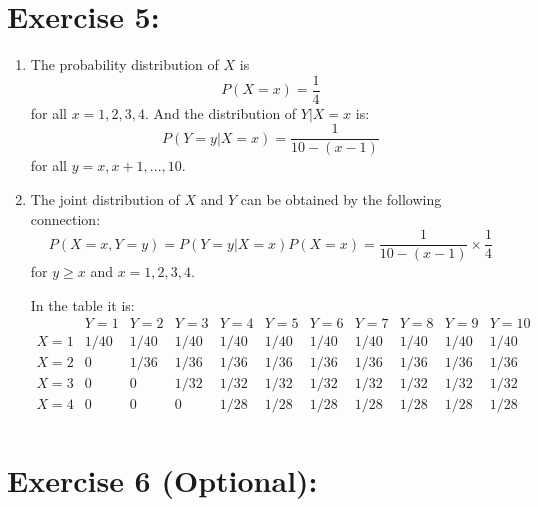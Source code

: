 \documentclass[12pt,thmsa]{article}
\begin{document}
\section*{Exercise 5:}

\begin{enumerate}
  \item The probability distribution of $X$ is
  \begin{equation*}
    P(X=x)=\frac{1}{4}  %
  \end{equation*}
for all $x=1,2,3,4$. And the distribution of $Y\vert X=x$ is:
  \begin{equation}
  P(Y=y\vert X=x)=\frac{1}{10-(x-1)} %
  \end{equation}
for all $y=x, x+1,...,10$.

  \item The joint distribution of $X$ and $Y$ can be obtained by the following connection:
\begin{equation*}
P(X=x,Y=y)=P(Y=y\vert X=x) P(X=x)=\frac{1}{10-(x-1)} \times \frac{1}{4}  %
\end{equation*}
for $y \geq x$ and $x=1,2,3,4$.

In the table it is:
$$
\begin{array}{c|c|c|c|c|c|c|c|c|c|c}
   & Y=1 & Y=2 & Y=3 & Y=4 & Y=5 & Y=6 & Y=7 & Y=8 & Y=9 & Y=10 \\ \hline
  X=1 & 1/40 & 1/40 & 1/40 & 1/40 & 1/40 & 1/40 & 1/40 & 1/40 & 1/40 & 1/40 \\ \hline
  X=2 & 0 & 1/36 & 1/36 & 1/36 & 1/36 & 1/36 & 1/36 & 1/36 & 1/36 & 1/36 \\ \hline
  X=3 & 0 & 0 & 1/32 & 1/32 & 1/32 & 1/32 & 1/32 & 1/32 & 1/32 & 1/32 \\ \hline
  X=4 & 0 & 0 & 0 & 1/28 & 1/28 & 1/28 & 1/28 & 1/28 & 1/28 & 1/28 \\
\end{array}
$$



\end{enumerate}


\section*{Exercise 6 (Optional):}
\end{document}
